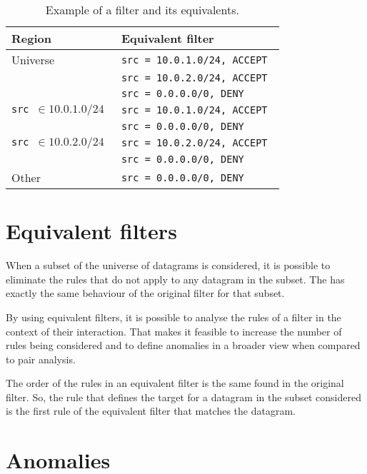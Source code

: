 \begin{table}
	\centering
	\caption{Example of a filter and its equivalents.}
	\begin{tabular}{l|l}
		Region                     & Equivalent filter \\
		\hline
		Universe                   & \tt{src = 10.0.1.0/24, ACCEPT} \\
		                           & \tt{src = 10.0.2.0/24, ACCEPT} \\
		                           & \tt{src = 0.0.0.0/0, DENY} \\
		\hline
		\tt{src} $\in 10.0.1.0/24$ & \tt{src = 10.0.1.0/24, ACCEPT} \\
		                           & \tt{src = 0.0.0.0/0, DENY} \\
		\hline
		\tt{src} $\in 10.0.2.0/24$ & \tt{src = 10.0.2.0/24, ACCEPT} \\
		                           & \tt{src = 0.0.0.0/0, DENY} \\
		\hline
		Other                      & \tt{src = 0.0.0.0/0, DENY} \\ 
	\end{tabular}
\end{table}


\section{Equivalent filters}

When a subset of the universe of datagrams is considered, it is possible to
eliminate the rules that do not apply to any datagram in the subset.
The  has exactly the same behaviour of the
original filter for that subset.

By using equivalent filters, it is possible to analyse the rules of a filter in
the context of their interaction. That makes it feasible to increase the number
of rules being considered and to define anomalies in a broader view when compared
to pair analysis.

The order of the rules in an equivalent filter is the same found in the original
filter. So, the rule that defines the target for a datagram in the subset considered
is the first rule of the equivalent filter that matches the datagram.



\section{Anomalies}

